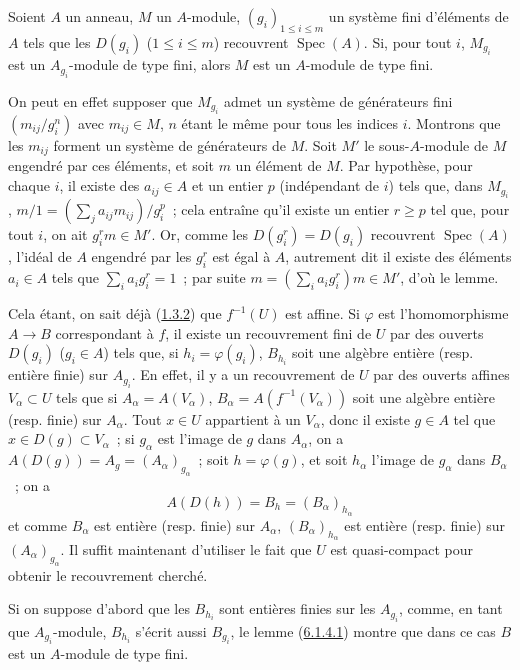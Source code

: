 \begin{lemma}[6.1.4.1]
\label{II.6.1.4.1-fr}
Soient $A$ un anneau, $M$ un $A$-module, $(g_i)_{1\leq i\leq m}$ un système
fini d'éléments de $A$ tels que les $D(g_i)$ ($1\leq i\leq m$) recouvrent
$\operatorname{Spec}(A)$. Si, pour tout $i$, $M_{g_i}$ est un
$A_{g_i}$-module de type fini, alors $M$ est un $A$-module de type fini.
\end{lemma}

On peut en effet supposer que $M_{g_i}$ admet un système de générateurs fini
$(m_{ij}/g_i^n)$ avec $m_{ij}\in M$, $n$ étant le même pour tous les indices
$i$. Montrons que les $m_{ij}$ forment un système de générateurs de $M$. Soit
$M'$ le sous-$A$-module de $M$ engendré par ces éléments, et soit $m$ un
élément de $M$. Par hypothèse, pour chaque $i$, il existe des $a_{ij}\in A$ et
un entier $p$ (indépendant de $i$) tels que, dans $M_{g_i}$,
$m/1=(\sum_j a_{ij}m_{ij})/g_i^p$~; cela entraîne qu'il existe un entier
$r\geq p$ tel que, pour tout $i$, on ait $g_i^r m\in M'$. Or, comme les
$D(g_i^r)=D(g_i)$ recouvrent $\operatorname{Spec}(A)$, l'idéal de $A$
engendré par les $g_i^r$ est égal à $A$, autrement dit il existe des éléments
$a_i\in A$ tels que $\sum_i a_i g_i^r=1$~; par suite
$m=(\sum_i a_i g_i^r)m\in M'$, d'où le lemme.

Cela étant, on sait déjà (\hyperref[II.1.3.2-fr]{1.3.2}) que $f^{-1}(U)$ est
affine. Si $\varphi$ est l'homomorphisme $A\to B$ correspondant à $f$, il
existe un recouvrement fini de $U$ par des ouverts $D(g_i)$ ($g_i\in A$) tels
que, si $h_i=\varphi(g_i)$, $B_{h_i}$ soit une algèbre entière (resp. entière
finie) sur $A_{g_i}$. En effet, il y a un recouvrement de $U$ par des ouverts
affines $V_\alpha\subset U$ tels que si
$A_\alpha=A(V_\alpha)$, $B_\alpha=A(f^{-1}(V_\alpha))$ soit une algèbre
entière (resp. finie) sur $A_\alpha$. Tout $x\in U$ appartient à un
$V_\alpha$, donc il existe $g\in A$ tel que $x\in D(g)\subset V_\alpha$~; si
$g_\alpha$ est l'image de $g$ dans $A_\alpha$, on a
$A(D(g))=A_g=(A_\alpha)_{g_\alpha}$~; soit $h=\varphi(g)$, et soit $h_\alpha$
l'image de $g_\alpha$ dans $B_\alpha$~; on a
\[
A(D(h))=B_h=(B_\alpha)_{h_\alpha}
\]
et comme $B_\alpha$ est entière (resp. finie) sur $A_\alpha$,
$(B_\alpha)_{h_\alpha}$ est entière (resp. finie) sur
$(A_\alpha)_{g_\alpha}$. Il suffit maintenant d'utiliser le fait que $U$ est
quasi-compact pour obtenir le recouvrement cherché.

Si on suppose d'abord que les $B_{h_i}$ sont entières finies sur les
$A_{g_i}$, comme, en tant que $A_{g_i}$-module, $B_{h_i}$ s'écrit aussi
$B_{g_i}$, le lemme (\hyperref[II.6.1.4.1-fr]{6.1.4.1}) montre que dans ce cas
$B$ est un $A$-module de type fini.


